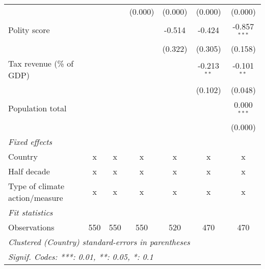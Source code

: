 \begin{tabular}{lcccccc}
                                                                             &               &               & (0.000)       & (0.000)       & (0.000)       & (0.000)\\   
   Polity score                                                              &               &               &               & -0.514        & -0.424        & -0.857$^{***}$\\   
                                                                             &               &               &               & (0.322)       & (0.305)       & (0.158)\\   
   Tax revenue (\% of GDP)                                                   &               &               &               &               & -0.213$^{**}$ & -0.101$^{**}$\\   
                                                                             &               &               &               &               & (0.102)       & (0.048)\\   
   Population total                                                          &               &               &               &               &               & 0.000$^{***}$\\   
                                                                             &               &               &               &               &               & (0.000)\\   
   \emph{Fixed effects}\\
   Country                                                                   & x             & x             & x             & x             & x             & x\\  
   Half decade                                                               & x             & x             & x             & x             & x             & x\\  
   Type of climate action/measure                                            & x             & x             & x             & x             & x             & x\\  
   \midrule \emph{Fit statistics}\\
   Observations                                                              & 550           & 550           & 550           & 520           & 470           & 470\\  
   \midrule
   \multicolumn{7}{l}{\emph{Clustered (Country) standard-errors in parentheses}}\\
   \multicolumn{7}{l}{\emph{Signif. Codes: ***: 0.01, **: 0.05, *: 0.1}}\\
\end{tabular}
\par\endgroup



